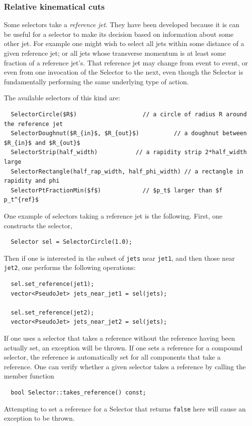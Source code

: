 \documentclass[12pt,a4]{article}
\newcommand{\ttt}[1]{{\small\texttt{#1}}}
\begin{document}
\subsubsection{Relative kinematical cuts}

Some selectors take a \emph{reference jet}. 
%
They have been developed because it is can be useful for a selector to
make its decision based on information about some other jet. 
%
For example one might wish to select all jets within some distance of
a given reference jet; or all jets whose transverse momentum is at
least some fraction of a reference jet's.
%
That reference jet may change from event to event, or even from one
invocation of the Selector to the next, even though the Selector is
fundamentally performing the same underlying type of action.

The available selectors of this kind are:
\begin{lstlisting}
  SelectorCircle($R$)                   // a circle of radius R around the reference jet
  SelectorDoughnut($R_{in}$, $R_{out}$)          // a doughnut between $R_{in}$ and $R_{out}$
  SelectorStrip(half_width)           // a rapidity strip 2*half_width large 
  SelectorRectangle(half_rap_width, half_phi_width) // a rectangle in rapidity and phi
  SelectorPtFractionMin($f$)            // $p_t$ larger than $f p_t^{ref}$
\end{lstlisting}
%
One example of selectors taking a reference jet is the following. 
First, one constructs the selector, 
\begin{lstlisting}
  Selector sel = SelectorCircle(1.0);
\end{lstlisting}
Then if one is interested in the subset of \ttt{jets} near
\ttt{jet1}, and then those near \ttt{jet2}, one performs the following
operations:
\begin{lstlisting}
  sel.set_reference(jet1);
  vector<PseudoJet> jets_near_jet1 = sel(jets);

  sel.set_reference(jet2);
  vector<PseudoJet> jets_near_jet2 = sel(jets);
\end{lstlisting}
If one uses a selector that takes a reference without the reference having been
actually set, an exception will be thrown.
%
If one sets a reference for a compound selector, the reference is
automatically set for all components that take a reference.
%
One can verify whether a given selector takes a reference by calling
the member function
\begin{lstlisting}
  bool Selector::takes_reference() const;
\end{lstlisting}
Attempting to set a reference for a Selector that returns \ttt{false}
here will cause an exception to be thrown.
%
\end{document}
